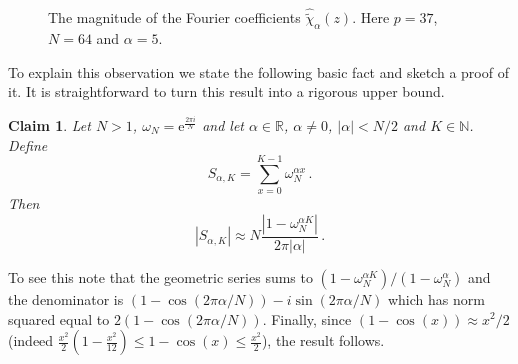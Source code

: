 \documentclass[11pt]{article}
\newtheorem{claim}[theorem]{Claim}
\theoremstyle{definition}
\newcommand{\N}{\mathbb{N}}
\newcommand{\R}{\mathbb{R}}
\begin{document}
\begin{figure}[!h]
    \begin{center}
    \end{center}
    \caption{The magnitude of the Fourier coefficients  $\widehat{\widetilde{\chi}}_\alpha(z)$. Here  $p=37$, $N=64$ and $\alpha = 5$.}\label{characterMS}
\end{figure}
To explain this observation we state the following basic fact and sketch a proof of it.
It is straightforward to turn this result into a rigorous upper bound.

\begin{claim} \label{fact1}
    Let $N > 1$, $\omega_N = \mathrm{e}^{\frac{2 \pi i}{N}}$ and let $\alpha \in \R$, $\alpha \ne 0$, $|\alpha| < N/2$ and $K \in \N$. Define
    \[
        S_{\alpha, K} = \sum_{x = 0}^{K-1} \omega_N^{\alpha x } \,.
    \]
    Then
    \[
        | S_{\alpha, K} | \approx N \frac{|1 - \omega_N^{\alpha K} |}{2 \pi |\alpha| } \,.
    \]
\end{claim}

To see this note that the geometric series  sums to $(1 - \omega_N^{\alpha K} ) / ( 1 - \omega_N^{\alpha} )$ and the denominator is $   ( 1-  \cos( 2 \pi \alpha/N)) - i \sin( 2 \pi \alpha / N )$
which has norm squared equal to $2(1 - \cos( 2 \pi \alpha / N ) )$.
Finally, since $(1  - \cos(x)) \approx x^2/2$ (indeed $\tfrac{x^2}{2}( 1 - \tfrac{x^2}{12}) \le 1 - \cos(x) \le \tfrac{x^2}{2}$), the result follows.
\end{document}
